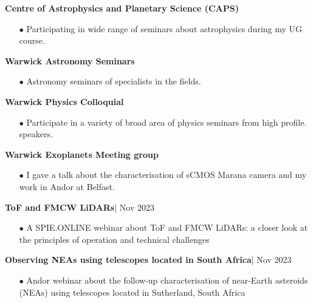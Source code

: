 \documentclass[10pt]{article}
\begin{document}
\textbf{\large{Centre of Astrophysics and Planetary Science (CAPS)}}
\\[-0.6cm]
\begin{itemize}[itemsep = -0.75 mm, leftmargin=*]
    \item[{\color[RGB]{10,0,254}$\bullet$}] \noindent Participating in wide range of seminars about astrophysics during my UG course.
\end{itemize}
\vspace{-2pt}
\textbf{\large{Warwick Astronomy Seminars}}  
\\[-0.6cm]
\begin{itemize}[itemsep = -0.75 mm, leftmargin=*]
    \item[{\color[RGB]{10,0,254}$\bullet$}] \noindent Astronomy seminars of specialists in the fields. 
\end{itemize}
\vspace{-2pt}
\textbf{\large{Warwick Physics Colloquial}}  
\\[-0.6cm]
\begin{itemize}[itemsep = -0.75 mm, leftmargin=*]
    \item[{\color[RGB]{10,0,254}$\bullet$}] Participate in a variety of broad area of physics seminars from high profile.
    speakers.
\end{itemize}
\vspace{-2pt}
\textbf{\large{Warwick Exoplanets Meeting group}}  
\\[-0.6cm]
\begin{itemize}[itemsep = -0.75 mm, leftmargin=*]
    \item[{\color[RGB]{10,0,254}$\bullet$}] I gave a talk about the characterisation of sCMOS Marana camera and my work in Andor at Belfast.
\end{itemize}
\textbf{\large ToF and FMCW LiDARs}|  \hfill { \small Nov 2023}
\\[-0.5cm]

\begin{itemize}[itemsep = -0.75 mm, leftmargin=*]
    \item[{\color[RGB]{10,0,254}$\bullet$}] \noindent A SPIE.ONLINE webinar about ToF and FMCW LiDARs: a closer look at the principles of operation and technical challenges 
\end{itemize}
\textbf{\large Observing NEAs using telescopes located in South Africa}|  \hfill { \small Nov 2023}
\\[-0.5cm]

\begin{itemize}[itemsep = -0.75 mm, leftmargin=*]
    \item[{\color[RGB]{10,0,254}$\bullet$}] \noindent  Andor webinar about the follow-up characterisation of near-Earth asteroids (NEAs) using telescopes located in Sutherland, South Africa
\end{itemize}
\end{document}
